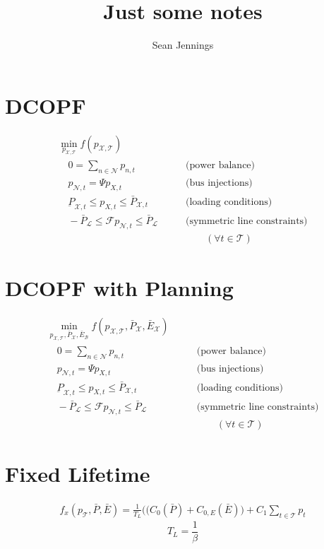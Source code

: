 \documentclass{homework}
\title{Just some notes}
\author{Sean Jennings}
\date{}
\begin{document}
\maketitle

\renewcommand{\L}{\mathcal{L}}
\renewcommand{\X}{\mathcal{X}}
\newcommand{\T}{\mathcal{T}}
\renewcommand{\N}{\mathcal{N}}
\newcommand{\B}{\mathcal{B}}

\section{DCOPF}
\begin{align*}
\min_{p_{\X, \T}} f(p_{\X, \T}) \\
    \quad 0 = \sum_{n\in\N} p_{n, t}    &\qquad \text{(power balance)} \\
    \quad p_{\N, t} = \Psi p_{X, t}  &\qquad \text{(bus injections)} \\
    \quad \underbar{P}_{\X, t} \leq  p_{X, t}  \leq  \bar{P}_{\X, t}  &\qquad
        \text{(loading conditions)} \\
    \quad -\bar{P}_\L \leq \mathcal{F} p_{\N, t} \leq \bar{P}_\L
        &\qquad \text{(symmetric line constraints)} \\
&\qquad \qquad(\forall t \in \T)
\end{align*}

\section{DCOPF with Planning}
\begin{align*}
\min_{p_{\X, \T}, \bar{P}_\X, \bar{E}_\B} f(p_{\X, \T}, \bar{P}_\X, \bar{E}_\X) \\
    \quad 0 = \sum_{n\in\N} p_{n, t}    &\qquad \text{(power balance)} \\
    \quad p_{\N, t} = \Psi p_{X, t}  &\qquad \text{(bus injections)} \\
    \quad \underbar{P}_{\X, t} \leq  p_{X, t}  \leq  \bar{P}_{\X, t}  &\qquad
        \text{(loading conditions)} \\
    \quad -\bar{P}_\L \leq \mathcal{F} p_{\N, t} \leq \bar{P}_\L
        &\qquad \text{(symmetric line constraints)} \\
&\qquad \qquad(\forall t \in \T)
\end{align*}

\section{Fixed Lifetime}
\begin{align*}
    f_x(p_{\T}, \bar{P}, \bar{E}) = \frac{1}{T_L}\biggl((C_0(\bar{P}) + C_{0,E}(\bar{E})\biggr) + C_1 \sum_{t\in\T} p_t
\end{align*}
\begin{equation*}
    T_L = \frac{1}{\beta}
\end{equation*}
\end{document}
